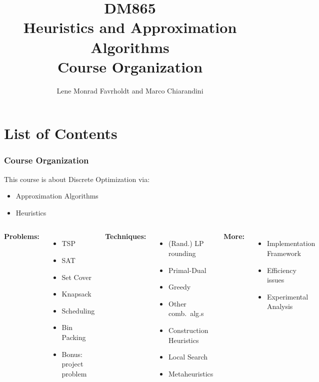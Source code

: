 \documentclass[handout,usepdftitle=false,aspectratio=169,smaller,compress,sans,fleqn,xcolor=dvipsnames,fleqn,table]{beamer}
\title{{\color{black}\normalfont\small DM865}\\
{\color{black}\normalfont\small Heuristics and Approximation Algorithms}\\[2em]
%
Course Organization}
\author{\alert{Lene Monrad Favrholdt} and Marco Chiarandini}
\date{}
\begin{document}
\frame[plain]{%
\titlepage


}
%
%
%


\section{List of Contents}

\begin{frame}%
  \frametitle{Course Organization}

This course is about Discrete Optimization via:
\begin{itemize}

\item Approximation Algorithms
\item Heuristics 
\end{itemize}

\medskip

\pause
\begin{columns}[T,onlytextwidth]
\textbf{Problems:}

\begin{itemize}
  \itemsep=1ex
\item TSP
\item SAT
\item Set Cover
\item Knapsack
\item Scheduling
\item Bin Packing
\item Bonus: project problem
  \end{itemize}


\textbf{Techniques:} 

\begin{itemize}
  \itemsep=1ex
\item (Rand.) LP rounding
\item Primal-Dual
\item Greedy
\item Other comb.\ alg.s
  
\medskip
\item Construction Heuristics
\item Local Search
\item Metaheuristics
  \end{itemize}

\textbf{More:}
\begin{itemize}
  \itemsep=1ex
\item Implementation Framework
\item Efficiency issues
\item Experimental Analysis
  \end{itemize}

\end{columns}

\end{frame}
\end{document}
